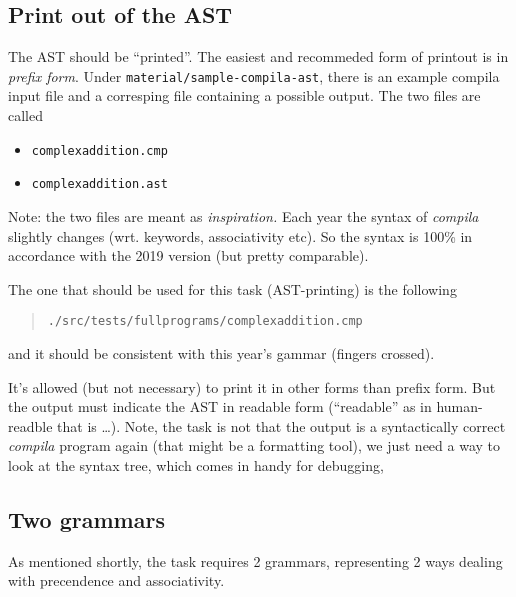 \documentclass[10pt,freeform]{handout}[2014/08/13]
\begin{document}
\subsection{Print out of the AST}
\label{sec:print-out-ast}


The AST should be ``printed''. The easiest and recommeded form of printout
is in \emph{prefix form}. Under \texttt{material/sample-compila-ast}, there
is an example compila input file and a corresping file containing a
possible output. The two files are called

\begin{itemize}
\item \texttt{complexaddition.cmp}
\item \texttt{complexaddition.ast}
\end{itemize}


Note: the two files are meant as \emph{inspiration.} Each year the syntax
of \textsl{compila} slightly changes (wrt. keywords, associativity etc). So
the syntax is 100\% in accordance with the 2019 version (but pretty
comparable).

The one that should be used for this task (AST-printing) is the following

\begin{quote}
  \texttt{./src/tests/fullprograms/complexaddition.cmp}  
\end{quote}

and it should be consistent with this year's gammar (fingers crossed).



It's allowed (but not necessary) to print it in other forms than prefix
form. But the output must indicate the AST in readable form (``readable''
as in human-readble that is \ldots). Note, the task is not that the output
is a syntactically correct \textsl{compila} program again (that might be a
formatting tool), we just need a way to look at the syntax tree, which
comes in handy for debugging,


%
% 

\subsection{Two grammars}
\label{sec:two-grammars}


As mentioned shortly, the task requires 2 grammars, representing 2 ways
dealing with precendence and associativity.
\end{document}

